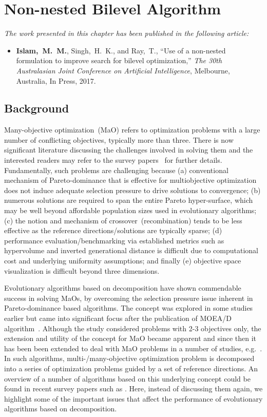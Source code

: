 \chapter{Non-nested Bilevel Algorithm}

 
\begin{tcolorbox}
\textit{The work presented in this chapter has been published in the following article:}
\begin{itemize}
\item \textbf{Islam,~M.~M.}, {Singh,~H.~K.}, and {Ray,~T.}, ``Use of a non-nested formulation to improve search for bilevel optimization,'' {\em The 30th  Australasian Joint Conference on Artificial Intelligence}, Melbourne, Australia, In Press, 2017.
\end{itemize}
\end{tcolorbox}
\section{Background}

Many-objective optimization~(MaO) refers to optimization problems with a large number of conflicting objectives, typically more than three. There is now significant literature discussing the challenges involved in solving them and the interested readers may refer to the survey papers~\cite{lucken2014survey,li2015many,trivedisurvey} for further details. Fundamentally, such problems are challenging because (a) conventional mechanism of Pareto-dominance that is effective for multiobjective optimization does not induce adequate selection pressure to drive solutions to convergence; (b) numerous solutions are required to span the entire Pareto hyper-surface, which may be well beyond affordable population sizes used in evolutionary algorithms; (c) the notion and mechanism of crossover~(recombination) tends to be less effective as the reference directions/solutions are typically sparse; (d) performance evaluation/benchmarking via established metrics such as hypervolume and inverted generational distance is difficult due to computational cost and underlying uniformity assumptions; and finally (e) objective space visualization is difficult beyond three dimensions.

Evolutionary algorithms based on decomposition have shown commendable success in solving MaOs, by overcoming the selection pressure issue inherent in Pareto-dominance based algorithms. The concept was explored in some studies earlier but came into significant focus after the publication of MOEA/D algorithm~\cite{zhang2007moead}. Although the study considered problems with 2-3 objectives only, the extension and utility of the concept for MaO became apparent and since then it has been been extended to deal with MaO problems in a number of studies, e.g.~\cite{Asafmany2015}. In such algorithms, multi-/many-objective optimization problem is decomposed into a series of optimization problems guided by a set of reference directions. An overview of a number of algorithms based on this underlying concept could be found in recent survey papers such as \cite{li2015many,lucken2014survey,trivedisurvey}. Here, instead of discussing them again, we highlight some of the important issues that affect the performance of evolutionary algorithms based on decomposition.

